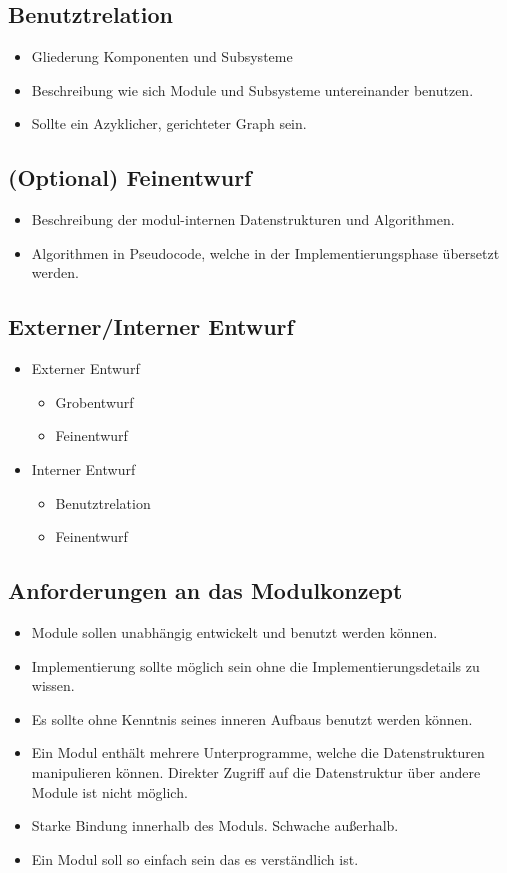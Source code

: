 \subsection{Benutztrelation}
\begin{itemize}
    \item Gliederung Komponenten und Subsysteme
    \item Beschreibung wie sich Module und Subsysteme untereinander benutzen.
    \item Sollte ein Azyklicher, gerichteter Graph sein.
\end{itemize}
\subsection{(Optional) Feinentwurf}
\begin{itemize}
    \item Beschreibung der modul-internen Datenstrukturen und Algorithmen.
    \item Algorithmen in Pseudocode, welche in der Implementierungsphase übersetzt werden.
\end{itemize}

\subsection{Externer/Interner Entwurf}
\begin{itemize}
    \item Externer Entwurf
    \begin{itemize}
        \item Grobentwurf
        \item Feinentwurf
    \end{itemize}
    \item Interner Entwurf
    \begin{itemize}
        \item Benutztrelation
        \item Feinentwurf
    \end{itemize}
\end{itemize}

\subsection{Anforderungen an das Modulkonzept}
\begin{itemize}
    \item Module sollen unabhängig entwickelt und benutzt werden können.
    \item Implementierung sollte möglich sein ohne die Implementierungsdetails zu wissen.
    \item Es sollte ohne Kenntnis seines inneren Aufbaus benutzt werden können.
    \item Ein Modul enthält mehrere Unterprogramme, welche die Datenstrukturen manipulieren können. Direkter Zugriff auf die Datenstruktur über andere Module ist nicht möglich.
    \item Starke Bindung innerhalb des Moduls. Schwache außerhalb.
    \item Ein Modul soll so einfach sein das es verständlich ist.
\end{itemize}

